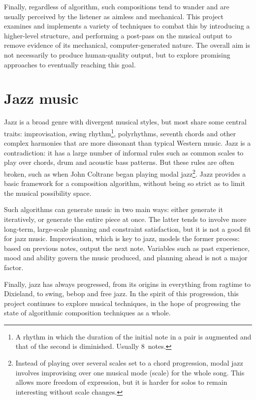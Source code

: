 Finally, regardless of algorithm, such compositions tend to wander and are usually perceived by the listener as aimless and mechanical. This project examines and implements a variety of techniques to combat this by introducing a higher-level structure, and performing a post-pass on the musical output to remove evidence of its mechanical, computer-generated nature. The overall aim is not necessarily to produce human-quality output, but to explore promising approaches to eventually reaching this goal.

\section{Jazz music}

Jazz is a broad genre with divergent musical styles, but most share some central traits: improvisation, swing rhythm\footnote{A rhythm in which the duration of the initial note in a pair is augmented and that of the second is diminished. Usually 8\th\ notes.}, polyrhythms, seventh chords and other complex harmonies that are more dissonant than typical Western music. Jazz is a contradiction: it has a large number of informal rules such as common scales to play over chords, drum and acoustic bass patterns. But these rules are often broken, such as when John Coltrane began playing modal jazz\footnote{Instead of playing over several scales set to a chord progression, modal jazz involves improvising over one musical mode (scale) for the whole song. This allows more freedom of expression, but it is harder for solos to remain interesting without scale changes.}. Jazz
provides a basic framework for a composition algorithm, without being so strict as to limit the musical possibility space.

Such algorithms can generate music in two main ways: either generate it iteratively, or generate the entire piece at once. The latter tends to involve more long-term, large-scale planning and constraint satisfaction, but it is not a good fit for jazz music. Improvisation, which is key to jazz, models the former process: based on previous notes, output the next note. Variables such as past experience, mood and ability govern the music produced, and planning ahead is not a major factor.

Finally, jazz has always progressed, from its origins in everything from ragtime to Dixieland, to swing, bebop and free jazz. In the spirit of this progression, this project continues to explore musical techniques, in the hope of progressing the state of algorithmic composition techniques as a whole.

